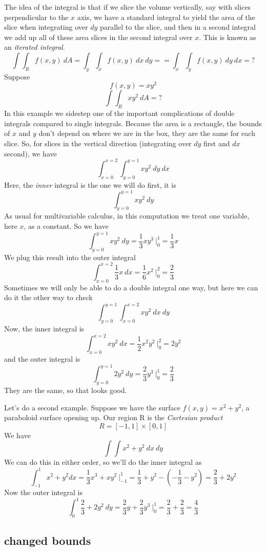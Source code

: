 \documentclass[11pt, oneside]{article}   	%
\begin{document}
The idea of the integral is that if we slice the volume vertically, say with slices perpendicular to the $x$ axis, we have a standard integral to yield the area of the slice when integrating over $dy$ parallel to the slice, and then in a second integral we add up all of these area slices in the second integral over $x$.  This is known as an \emph{iterated integral}.
\[ \int \int_R f(x,y) \ dA = \int_y \int_x f(x,y) \ dx \ dy = = \int_x \int_y f(x,y) \ dy \ dx = ? \]
Suppose
\[ f(x,y) = xy^2 \]
\[ \int \int_R xy^2 \ dA = ? \]
In this example we sidestep one of the important complications of double integrals compared to single integrals.  Because the area is a rectangle, the bounds of $x$ and $y$ don't depend on where we are in the box, they are the same for each slice.  So, for slices in the vertical direction (integrating over $dy$ first and $dx$ second), we have
\[ \int_{x=0}^{x=2} \int_{y=0}^{y=1} xy^2 \ dy \ dx \]
Here, the \emph{inner} integral is the one we will do first, it is
\[ \int_{y=0}^{y=1} xy^2 \ dy \]
As usual for multivariable calculus, in this computation we treat one variable, here $x$, as a constant.  So we have
\[ \int_{y=0}^{y=1} xy^2 \ dy = \frac{1}{3} xy^3 \ \bigg |_0^1 = \frac{1}{3}x \]
We plug this result into the outer integral
\[ \int_{x=0}^{x=2} \frac{1}{3}x  \ dx = \frac{1}{6} x^2 \ \bigg |_0^2 = \frac{2}{3} \]
Sometimes we will only be able to do a double integral one way, but here we can do it the other way to check
\[ \int_{y=0}^{y=1} \int_{x=0}^{x=2} xy^2 \ dx \ dy \]
Now, the inner integral is 
\[ \int_{x=0}^{x=2} xy^2 \ dx = \frac{1}{2} x^2y^2 \ \bigg |_0^2 = 2y^2 \]
and the outer integral is
\[ \int_{y=0}^{y=1} 2y^2 \ dy = \frac{2}{3}y^3 \ \bigg |_0^1 = \frac{2}{3} \]
They are the same, so that looks good.

Let's do a second example.  Suppose we have the surface $f(x,y) = x^2 + y^2$,  a paraboloid surface opening up.  Our region R is the \emph{Cartesian product} 
\[ R = [-1,1] \times [0,1] \]
We have 
\[ \int \int x^2 + y^2 \ dx \ dy \]
We can do this in either order, so we'll do the inner integral as
\[ \int_{-1}^1 x^2 + y^2 dx = \frac{1}{3}x^3 + xy^2 \ \bigg |_{-1}^{1} = \frac{1}{3} + y^2 - (-\frac{1}{3} - y^2) = \frac{2}{3} + 2y^2 \]
Now the outer integral is
\[ \int_0^1 \frac{2}{3} + 2y^2 \ dy = \frac{2}{3}y + \frac{2}{3}y^3  \ \bigg |_{0}^{1} = \frac{2}{3} + \frac{2}{3} = \frac{4}{3} \]

\subsection*{changed bounds}
\end{document}
